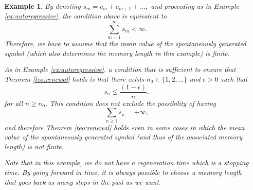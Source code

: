 \documentclass[a4paper]{article}
\newtheorem{example}[theorem]{Example}
\begin{document}
\begin{example}
By denoting $s_m=c_m+c_{m+1}+\ldots,$ and proceeding as in Example \ref{ex:autoregressive}, the condition above is equivalent to
$$
\sum_{m=1}^{\infty} s_m< \infty.
$$
Therefore, we have to assume that the mean value of the spontaneously generated symbol (which also determines the memory length in this example) is finite.

As in Example \ref{ex:autoregressive}, a condition that is sufficient to ensure that Theorem \ref{teo:renewal} holds is %
that there exists $n_0\in \{1,2,\ldots\}$ and $\epsilon >0$ such that
$$
s_n\leq \frac{(1-\epsilon)}{n},
$$
for all $n\geq n_0$. This condition does not exclude the possibility of having
$$
\sum_{n\geq 1}s_n=+\infty,
$$
and therefore Theorem \ref{teo:renewal} holds even in some cases in which the mean value of the spontaneously generated symbol (and thus of the associated memory length) is not finite.

Note that in this example, we do not have a regeneration time which is a stopping time. By going forward in time, it is always possible to choose a memory length that goes back as many steps in the past as we want.

\end{example}
\end{document}
